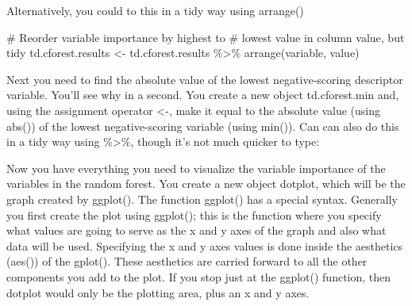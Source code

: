 \documentclass[
  10pt,
  letterpaper]{article}
\newenvironment{Shaded}{\begin{snugshade}}{\end{snugshade}}
\newcommand{\CommentTok}[1]{\textcolor[rgb]{0.37,0.37,0.37}{#1}}
\newcommand{\FunctionTok}[1]{\textcolor[rgb]{0.28,0.35,0.67}{#1}}
\newcommand{\NormalTok}[1]{\textcolor[rgb]{0.00,0.23,0.31}{#1}}
\newcommand{\OtherTok}[1]{\textcolor[rgb]{0.00,0.23,0.31}{#1}}
\newcommand{\SpecialCharTok}[1]{\textcolor[rgb]{0.37,0.37,0.37}{#1}}
\renewcommand\texttt[1]{{\ttfamily\color{BrickRed}#1}}
\begin{document}
Alternatively, you could to this in a \texttt{tidy} way using
\texttt{arrange()}

\begin{Shaded}
\begin{Highlighting}[]
\CommentTok{\# Reorder variable importance by highest to}
\CommentTok{\# lowest value in column value, but tidy}
\NormalTok{td.cforest.results }\OtherTok{\textless{}{-}}\NormalTok{ td.cforest.results }\SpecialCharTok{\%\textgreater{}\%}
    \FunctionTok{arrange}\NormalTok{(variable, value)}
\end{Highlighting}
\end{Shaded}

Next you need to find the absolute value of the lowest negative-scoring
descriptor variable. You'll see why in a second. You create a new object
\texttt{td.cforest.min} and, using the assignment operator
\texttt{\textless{}-}, make it equal to the absolute value (using
\texttt{abs()}) of the lowest negative-scoring variable (using
\texttt{min()}). Can can also do this in a \texttt{tidy} way using
\texttt{\%\textgreater{}\%}, though it's not much quicker to type:

\begin{Shaded}
\end{Shaded}

Now you have everything you need to visualize the variable importance of
the variables in the random forest. You create a new object
\texttt{dotplot}, which will be the graph created by \texttt{ggplot()}.
The function \texttt{ggplot()} has a special syntax. Generally you first
create the plot using \texttt{ggplot()}; this is the function where you
specify what values are going to serve as the \texttt{x} and \texttt{y}
axes of the graph and also what data will be used. Specifying the
\texttt{x} and \texttt{y} axes values is done inside the aesthetics
(\texttt{aes()}) of the \texttt{gplot()}. These aesthetics are carried
forward to all the other components you add to the plot. If you stop
just at the \texttt{ggplot()} function, then \texttt{dotplot} would only
be the plotting area, plus an \texttt{x} and \texttt{y} axes.
\end{document}
